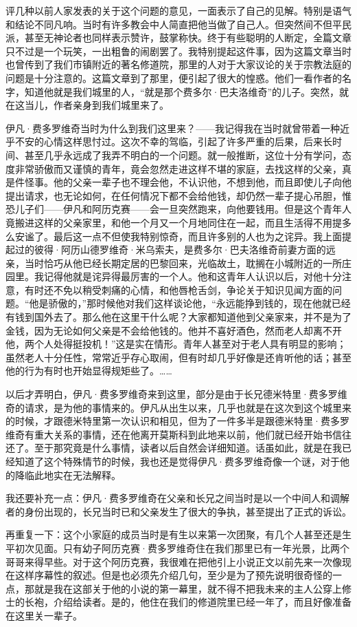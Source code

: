 评几种以前人家发表的关于这个问题的意见，一面表示了自己的见解。特别是语气和结论不同凡响。当时有许多教会中人简直把他当做了自己人。但突然间不但平民派，甚至无神论者也同样表示赞许，鼓掌称快。终于有些聪明的人断定，全篇文章只不过是一个玩笑，一出粗鲁的闹剧罢了。我特别提起这件事，因为这篇文章当时也曾传到了我们市镇附近的著名修道院，那里的人对于大家议论的关于宗教法庭的问题是十分注意的。这篇文章到了那里，便引起了很大的惶惑。他们一看作者的名字，知道他就是我们城里的人，“就是那个费多尔·巴夫洛维奇”的儿子。突然，就在这当儿，作者亲身到我们城里来了。
\par 伊凡·费多罗维奇当时为什么到我们这里来？——我记得我在当时就曾带着一种近乎不安的心情这样思忖过。这次不幸的驾临，引起了许多严重的后果，后来长时间、甚至几乎永远成了我弄不明白的一个问题。就一般推断，这位十分有学问，态度非常骄傲而又谨慎的青年，竟会忽然走进这样不堪的家庭，去找这样的父亲，真是件怪事。他的父亲一辈子也不理会他，不认识他，不想到他，而且即使儿子向他提出请求，也无论如何，在任何情况下都不会给他钱，却仍然一辈子提心吊胆，惟恐儿子们——伊凡和阿历克赛——会一旦突然跑来，向他要钱用。但是这个青年人竟搬进这样的父亲家里，和他一个月又一个月地同住在一起，而且生活得不用提多么安谧了。最后这一点不但使我特别惊奇，而且许多别的人也为之诧异。我上面提起过的彼得·阿历山德罗维奇·米乌索夫，是费多尔·巴夫洛维奇前妻方面的远亲，当时恰巧从他已经长期定居的巴黎回来，光临故土，耽搁在小城附近的一所庄园里。我记得他就是诧异得最厉害的一个人。他和这青年人认识以后，对他十分注意，有时还不免以稍受刺痛的心情，和他唇枪舌剑，争论关于知识见闻方面的问题。“他是骄傲的，”那时候他对我们这样谈论他，“永远能挣到钱的，现在他就已经有钱到国外去了。那么他在这里干什么呢？大家都知道他到父亲家来，并不是为了金钱，因为无论如何父亲是不会给他钱的。他并不喜好酒色，然而老人却离不开他，两个人处得挺投机！”这是实在情形。青年人甚至对于老人具有明显的影响；虽然老人十分任性，常常近乎存心取闹，但有时却几乎好像是还肯听他的话；甚至他的行为有时也开始显得规矩些了。……
\par 以后才弄明白，伊凡·费多罗维奇来到这里，部分是由于长兄德米特里·费多罗维奇的请求，是为他的事情来的。伊凡从出生以来，几乎也就是在这次到这个城里来的时候，才跟德米特里第一次认识和相见，但为了一件多半是跟德米特里·费多罗维奇有重大关系的事情，还在他离开莫斯科到此地来以前，他们就已经开始书信往还了。至于那究竟是什么事情，读者以后自然会详细知道。话虽如此，就是在我已经知道了这个特殊情节的时候，我也还是觉得伊凡·费多罗维奇像一个谜，对于他的降临此地实在无法解释。
\par 我还要补充一点：伊凡·费多罗维奇在父亲和长兄之间当时是以一个中间人和调解者的身份出现的，长兄当时已和父亲发生了很大的争执，甚至提出了正式的诉讼。
\par 再重复一下：这个小家庭的成员当时是有生以来第一次团聚，有几个人甚至还是生平初次见面。只有幼子阿历克赛·费多罗维奇住在我们那里已有一年光景，比两个哥哥来得早些。对于这个阿历克赛，我很难在把他引上小说正文以前先来一次像现在这样序幕性的叙述。但是也必须先介绍几句，至少是为了预先说明很奇怪的一点，那就是我在这部关于他的小说的第一幕里，就不得不把我未来的主人公穿上修士的长袍，介绍给读者。是的，他住在我们的修道院里已经一年了，而且好像准备在这里关一辈子。
